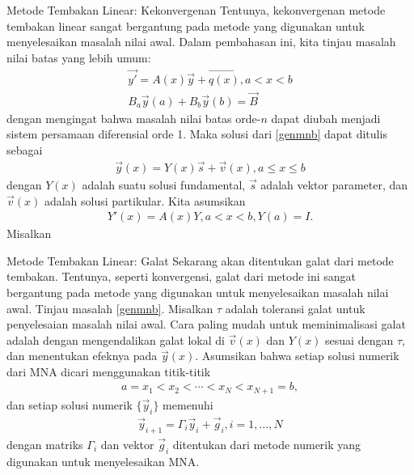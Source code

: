 \documentclass[xcolor={dvipsnames}, 9pt]{beamer}
\begin{document}
    \begin{frame}{Metode Tembakan Linear: Kekonvergenan}
    	Tentunya, kekonvergenan metode tembakan linear sangat bergantung pada metode yang digunakan untuk menyelesaikan masalah nilai awal. Dalam pembahasan ini, kita tinjau masalah nilai batas yang lebih umum:
    	\begin{gather}
    		\vec{y'} = A(x)\vec{y} + \vec{q(x)}, a<x<b \\
    		B_a\vec{y}(a) + B_b\vec{y}(b) = \vec{B} \label{genmnb}
    	\end{gather}
    	dengan mengingat bahwa masalah nilai batas orde-$n$ dapat diubah menjadi sistem persamaan diferensial orde 1. Maka solusi dari \eqref{genmnb} dapat ditulis sebagai
        \begin{align*}
            \vec{y}(x) = Y(x)\vec{s} + \vec{v}(x), a\leq x\leq b
        \end{align*}
        dengan $Y(x)$ adalah suatu solusi fundamental, $\vec{s}$ adalah vektor parameter, dan $\vec{v}(x)$ adalah solusi partikular. Kita asumsikan
        \begin{align*}
            Y'(x) = A(x)Y, a<x<b, Y(a) = I.
        \end{align*}
        Misalkan 
    \end{frame}
    \begin{frame}{Metode Tembakan Linear: Galat}
    	Sekarang akan ditentukan galat dari metode tembakan. Tentunya, seperti konvergensi, galat dari metode ini sangat bergantung pada metode yang digunakan untuk menyelesaikan masalah nilai awal. Tinjau masalah \eqref{genmnb}. \newline
        Misalkan $\tau$ adalah toleransi galat untuk penyelesaian masalah nilai awal. Cara paling mudah untuk meminimalisasi galat adalah dengan mengendalikan galat lokal di $\vec{v}(x)$ dan $Y(x)$ sesuai dengan $\tau$, dan menentukan efeknya pada $\vec{y}(x)$. \newline
        Asumsikan bahwa setiap solusi numerik dari MNA dicari menggunakan titik-titik
        \begin{align*}
            a = x_1 < x_2 < \cdots < x_N < x_{N+1} = b,
        \end{align*}
        dan setiap solusi numerik $\{\vec{y}_i\}$ memenuhi
        \begin{align}\label{discretescheme}
            \vec{y}_{i+1} = \Gamma_i\vec{y}_i + \vec{g}_i, i = 1,\dots, N
        \end{align}
        dengan matriks $\Gamma_i$ dan vektor $\vec{g}_i$ ditentukan dari metode numerik yang digunakan untuk menyelesaikan MNA.
    \end{frame}
\end{document}

